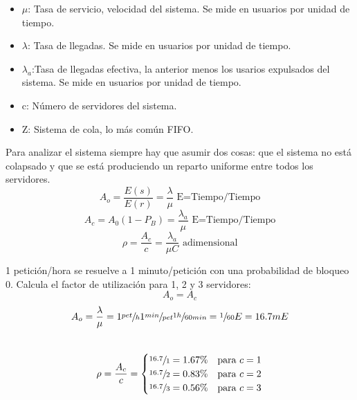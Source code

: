 \begin{itemize}
	\item $\mu$: Tasa de servicio, velocidad del sistema. Se mide en usuarios por unidad de tiempo.\\
	\item $\lambda$: Tasa de llegadas. Se mide en usuarios por unidad de tiempo.\\
	\item $\lambda_a$:Tasa de llegadas efectiva, la anterior menos los usarios expulsados del sistema. Se mide en usuarios por unidad de tiempo.\\
	\item c: Número de servidores del sistema.\\
	\item Z: Sistema de cola, lo más común \acrshort{FIFO}.\\
\end{itemize}
Para analizar el sistema siempre hay que asumir dos cosas: que el sistema no está colapsado y que se está produciendo un reparto uniforme entre todos los servidores.\\
\begin{equation}%
A_o=\frac{E(s)}{E(r)}=\frac{\lambda}{\mu}\text{ E=Tiempo/Tiempo}
\end{equation}
\begin{equation}%
A_c=A_0(1-P_B)=\frac{\lambda_a}{\mu}\text{ E=Tiempo/Tiempo}
\end{equation}
\begin{equation}%
\rho=\frac{A_c}{c}=\frac{\lambda_a}{\mu C}\text{ adimensional}
\end{equation}
\begin{example}
1 petición/hora se resuelve a 1 minuto/petición con una probabilidad de bloqueo 0. Calcula el factor de utilización para 1, 2 y 3 servidores:\\
\[A_o=A_c\]
\[A_o=\frac{\lambda}{\mu}=1\sfrac{pet}{h}1\sfrac{min}{pet}\sfrac{1h}{60min}=\sfrac{1}{60}E=16.7mE\]\\
\[\rho=\frac{A_c}{c}=
\begin{cases}
\sfrac{16.7}{1}=1.67\% & \text{para } c=1\\
\sfrac{16.7}{2}=0.83\% & \text{para } c=2\\
\sfrac{16.7}{3}=0.56\% & \text{para } c=3
\end{cases}\]
\end{example}


